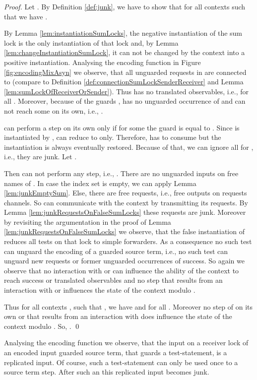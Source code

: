 \documentclass[]{llncs}
\begin{document}
\begin{proof}
	Let . By Definition \ref{def:junk}, we have to show that for all contexts  such that  we have .
	
	By Lemma \ref{lem:instantiationSumLocks}, the negative instantiation of the sum lock  is the only instantiation of that lock and, by Lemma \ref{lem:changeInstantiationSumLock}, it can not be changed by the context into a positive instantiation. Analysing the encoding function in Figure \ref{fig:encodingMixAsyn} we observe, that all unguarded requests in  are connected to  (compare to Definition \ref{def:connectionSumLockSenderReceiver} and Lemma \ref{lem:sumLockOfReceiverOrSender}). Thus  has no translated observables, i.e.,  for all . Moreover, because of the guards ,  has no unguarded occurrence of  and can not reach some on its own, i.e., .
	
	 can perform a step on its own only if for some  the guard  is equal to . Since  is instantiated by ,  can reduce to  only. Therefore,  has to consume  but the instantiation is always eventually restored. Because of that, we can ignore all  for , i.e., they are junk. Let .
	
	Then  can not perform any step, i.e., . There are no unguarded inputs on free names of . In case the index set  is empty, we can apply Lemma \ref{lem:junkEmptySum}. Else, there are free requests, i.e., free outputs on requests channels. So  can communicate with the context by transmitting its requests. By Lemma \ref{lem:junkRequestsOnFalseSumLocks} these requests are junk. Moreover by revisiting the argumentation in the proof of Lemma \ref{lem:junkRequestsOnFalseSumLocks} we observe, that the false instantiation of  reduces all tests on that lock to simple forwarders. As a consequence no such test can unguard the encoding of a guarded source term, i.e., no such test can unguard new requests or former unguarded occurrences of success. So again we observe that no interaction with  or  can influence the ability of the context to reach success or translated observables and no step that results from an interaction with  or  influences the state of the context modulo .
	
	Thus for all contexts , such that , we have  and  for all . Moreover no step of  on its own or that results from an interaction with  does influence the state of the context modulo . So, .
	\qed
\end{proof}

Analysing the encoding function we observe, that the input on a receiver lock of an encoded input guarded source term, that guards a test-statement, is a replicated input. Of course, such a test-statement can only be used once to \simulate a source term step. After such an \simulation this replicated input becomes junk.
\end{document}
